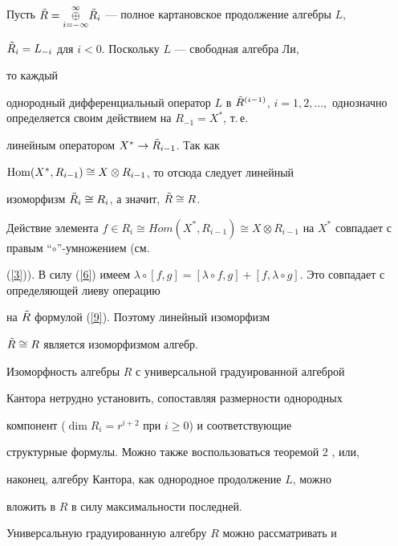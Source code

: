 \begin{pf} Пусть $\Tilde R=\treato{i=-\infty}{\infty }


\Tilde R_i$ --- полное картановское продолжение алгебры $L$,


$\Tilde R_i= L_{-i}$ для $i<0$. Поскольку $L$ --- свободная алгебра Ли,


то каждый


однородный дифференциальный оператор $L$ в $\Tilde R^{(i-1)}$, $i=1,2,


\dotsc,$ однозначно определяется своим действием на $R_{-1}=X^*$, т.\,е.


линейным оператором $X^* \to \Tilde R_{i-1}$. Так как


$\operatorname{Hom} (X^*,R_{i-1})\cong X\otimes R_{i-1}$, то отсюда следует линейный


изоморфизм $\Tilde R_i \cong R_i$, а значит, $\Tilde R \cong R$.





Действие элемента $f\in R_i \cong Hom (X^{*},R_{i-1})\cong


X\otimes R_{i-1}$ на $X^*$ совпадает с правым ``$\circ$''-умножением (см.


(\ref{3})). В силу (\ref{6}) имеем $\lambda \circ [f,g]=[\lambda \circ


f,g]+[f,\lambda \circ g]$. Это совпадает с определяющей лиеву операцию


на $\Tilde R$ формулой (\ref{9}). Поэтому линейный изоморфизм


$\Tilde R \cong R$ является изоморфизмом алгебр.





Изоморфность алгебры $R$ с универсальной градуированной алгеброй


Кантора нетрудно установить, сопоставляя размерности однородных


компонент ($\dim R_i=r^{i+2}$ при $i\ge 0$) и соответствующие


структурные формулы. Можно также воспользоваться теоремой 2 \cite{Kan}, или,


наконец, алгебру Кантора, как однородное продолжение $L$, можно


вложить в $R$ в силу максимальности последней.


\end{pf}





Универсальную градуированную алгебру $R$ можно рассматривать и


